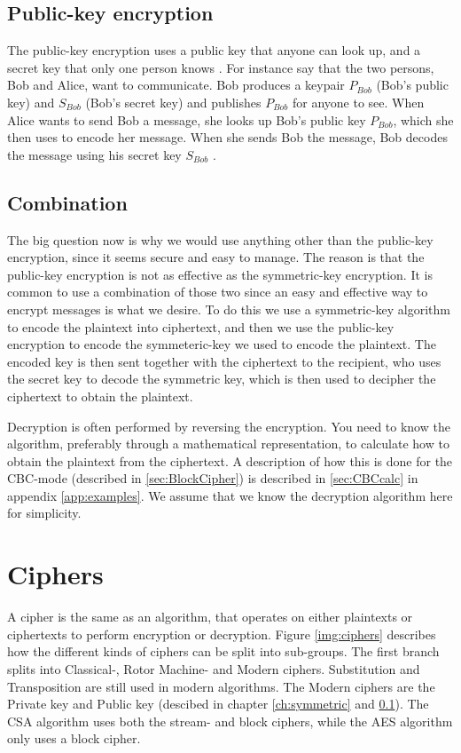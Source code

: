 \subsection{Public-key encryption}\label{ch:public}
The public-key encryption uses a public key that anyone can look up, 
and a secret key that only one person knows 
\citep[pp. 25--32]{Simmons:1992}. For instance say that the two 
persons, Bob and Alice, want to communicate. Bob produces a keypair 
\(P_{Bob}\) (Bob’s public key) and \(S_{Bob}\) (Bob’s secret key) and 
publishes \(P_{Bob}\) for anyone to see. When Alice wants to send Bob a 
message, she looks up Bob’s public key \(P_{Bob}\), which she then uses 
to encode her message. When she sends Bob the message, Bob decodes the 
message using his secret key \(S_{Bob}\) \citep{Schneier:2003}.

\subsection{Combination}
The big question now is why we would use anything other than the 
public-key encryption, since it seems secure and easy to manage. The 
reason is that the public-key encryption is not as effective as the 
symmetric-key encryption. It is common to use a combination of those 
two since an easy and effective way to encrypt messages is what we 
desire. To do this we use a symmetric-key algorithm to encode the 
plaintext into ciphertext, and then we use the public-key encryption to 
encode the symmeteric-key we used to encode the plaintext. The encoded 
key is then sent together with the ciphertext to the recipient, who 
uses the secret key to decode the symmetric key, which is then used 
to decipher the ciphertext to obtain the plaintext.

Decryption is often performed by reversing the encryption. You need to 
know the algorithm, preferably through a mathematical representation, 
to calculate how to obtain the plaintext from the ciphertext. A 
description of how this is done for the CBC-mode (described in 
\ref{sec:BlockCipher}) is described in \ref{sec:CBCcalc} in appendix 
\ref{app:examples}. We assume that we know the decryption algorithm 
here for simplicity. 

\section{Ciphers}
A cipher is the same as an algorithm, that operates on either 
plaintexts or ciphertexts to perform encryption or decryption. Figure 
\ref{img:ciphers} describes how the different kinds of ciphers can be 
split into sub-groups. The first branch splits into Classical-, 
Rotor Machine- and Modern ciphers. Substitution and Transposition are 
still used in modern algorithms. The Modern ciphers are the Private 
key and Public key (descibed in chapter \ref{ch:symmetric} and 
\ref{ch:public}). The CSA algorithm uses both the stream- and block ciphers, while the AES algorithm only uses a block cipher.

